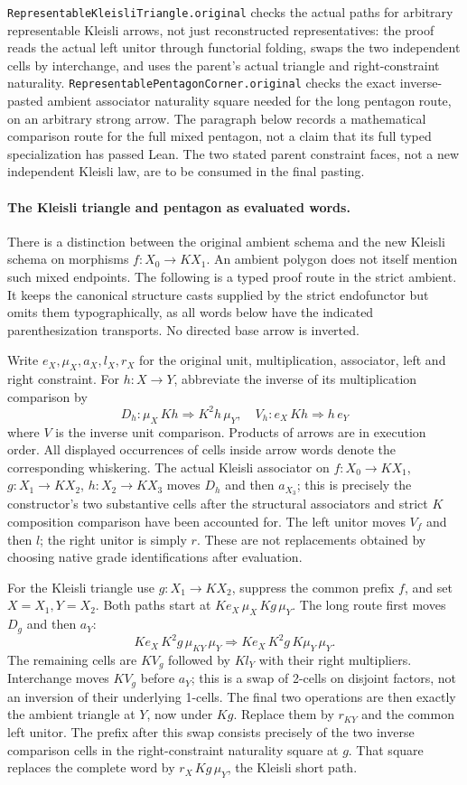 \documentclass[11pt]{article}
\newcommand{\code}[1]{\nolinkurl{#1}}
\begin{document}
\code{RepresentableKleisliTriangle.original} checks the actual paths for arbitrary representable Kleisli arrows, not just reconstructed representatives: the proof reads the actual left unitor through functorial folding, swaps the two independent cells by interchange, and uses the parent's actual triangle and right-constraint naturality. \code{RepresentablePentagonCorner.original} checks the exact inverse-pasted ambient associator naturality square needed for the long pentagon route, on an arbitrary strong arrow. The paragraph below records a mathematical comparison route for the full mixed pentagon, not a claim that its full typed specialization has passed Lean. The two stated parent constraint faces, not a new independent Kleisli law, are to be consumed in the final pasting.

\paragraph{The Kleisli triangle and pentagon as evaluated words.}
There is a distinction between the original ambient schema and the new
Kleisli schema on morphisms $f:X_0\to KX_1$. An ambient polygon does not itself
mention such mixed endpoints. The following is a typed proof route in the
strict ambient. It keeps the canonical structure casts supplied by the strict
endofunctor but omits them typographically, as all words below have the
indicated parenthesization transports. No directed base arrow is inverted.

Write $e_X,\mu_X,a_X,l_X,r_X$ for the original unit, multiplication,
associator, left and right constraint. For $h:X\to Y$, abbreviate the inverse
of its multiplication comparison by
\[
D_h:\mu_X\,Kh\Longrightarrow K^2h\,\mu_Y,\quad
V_h:e_X\,Kh\Longrightarrow h\,e_Y
\]
where $V$ is the inverse unit comparison. Products of arrows are in
execution order. All displayed occurrences of cells inside arrow words
denote the corresponding whiskering. The actual Kleisli associator on
$f:X_0\to KX_1$, $g:X_1\to KX_2$, $h:X_2\to KX_3$ moves $D_h$ and then
$a_{X_3}$; this is precisely the constructor's two substantive cells after
the structural associators and strict $K$ composition comparison have
been accounted for. The left unitor moves $V_f$ and then $l$; the right
unitor is simply $r$. These are not replacements obtained by choosing
native grade identifications after evaluation.

For the Kleisli triangle use $g:X_1\to KX_2$, suppress the common prefix
$f$, and set $X=X_1,Y=X_2$. Both paths start at
$Ke_X\,\mu_X\,Kg\,\mu_Y$. The long route first moves $D_g$ and then
$a_Y$:
\[
Ke_X\,K^2g\,\mu_{KY}\,\mu_Y
 \Longrightarrow Ke_X\,K^2g\,K\mu_Y\,\mu_Y.
\]
The remaining cells are $KV_g$ followed by $Kl_Y$ with their right
multipliers. Interchange moves $KV_g$ before $a_Y$; this is a swap of
2-cells on disjoint factors, not an inversion of their underlying
1-cells. The final two operations are then exactly the ambient triangle
at $Y$, now under $Kg$. Replace them by $r_{KY}$ and the common left
unitor. The prefix after this swap consists precisely of the two inverse
comparison cells in the right-constraint naturality square at $g$.
That square replaces the complete word by $r_X\,Kg\,\mu_Y$, the
Kleisli short path.
\end{document}
